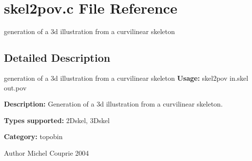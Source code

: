 \section{skel2pov.c File Reference}
\label{skel2pov_8c}


generation of a 3d illustration from a curvilinear skeleton  




\subsection{Detailed Description}
generation of a 3d illustration from a curvilinear skeleton {\bfseries Usage:} skel2pov in.skel out.pov

{\bfseries Description:} Generation of a 3d illustration from a curvilinear skeleton.

{\bfseries Types supported:} 2Dskel, 3Dskel

{\bfseries Category:} topobin

\begin{DoxyAuthor}{Author}
Michel Couprie 2004 
\end{DoxyAuthor}
